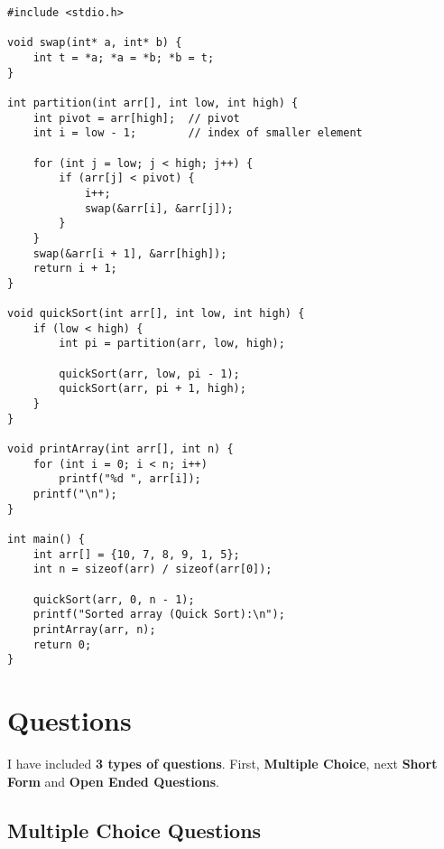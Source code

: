 \documentclass[a4paper,12pt]{article}
\begin{document}
\begin{lstlisting}
#include <stdio.h>

void swap(int* a, int* b) {
    int t = *a; *a = *b; *b = t;
}

int partition(int arr[], int low, int high) {
    int pivot = arr[high];  // pivot
    int i = low - 1;        // index of smaller element

    for (int j = low; j < high; j++) {
        if (arr[j] < pivot) {
            i++;
            swap(&arr[i], &arr[j]);
        }
    }
    swap(&arr[i + 1], &arr[high]);
    return i + 1;
}

void quickSort(int arr[], int low, int high) {
    if (low < high) {
        int pi = partition(arr, low, high);

        quickSort(arr, low, pi - 1);
        quickSort(arr, pi + 1, high);
    }
}

void printArray(int arr[], int n) {
    for (int i = 0; i < n; i++)
        printf("%d ", arr[i]);
    printf("\n");
}

int main() {
    int arr[] = {10, 7, 8, 9, 1, 5};
    int n = sizeof(arr) / sizeof(arr[0]);

    quickSort(arr, 0, n - 1);
    printf("Sorted array (Quick Sort):\n");
    printArray(arr, n);
    return 0;
}
\end{lstlisting}

\newpage

\section{Questions}

I have included \textbf{3 types of questions}. First, \textbf{Multiple Choice}, next \textbf{Short Form} and \textbf{Open Ended Questions}.

\subsection{Multiple Choice Questions}
\end{document}
